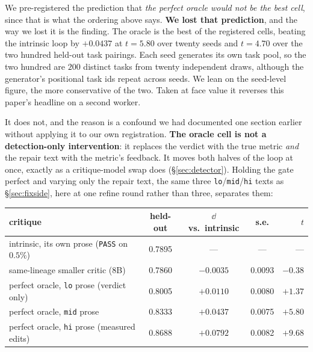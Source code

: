 \documentclass[11pt]{article}
\begin{document}
We pre-registered the prediction that \emph{the perfect oracle would not be the best cell}, since
that is what the ordering above says. \textbf{We lost that prediction}, and the way we lost it is
the finding. The oracle is the best of the registered cells, beating the intrinsic loop by
$+0.0437$ at $t = 5.80$ over twenty seeds and
$t = 4.70$ over the two hundred held-out task pairings. Each seed generates its own task pool, so
the two hundred are $200$ distinct tasks from twenty independent draws, although the generator's
positional task ids repeat across seeds. We lean on the seed-level figure, the more conservative
of the two. Taken at face value it reverses
this paper's headline on a second worker.

It does not, and the reason is a confound we had documented one section earlier without applying it
to our own registration. \textbf{The oracle cell is not a detection-only intervention}: it replaces
the verdict with the true metric \emph{and} the repair text with the metric's feedback. It moves
both halves of the loop at once, exactly as a critique-model swap does
(\S\ref{sec:detector}). Holding the gate perfect and varying only the repair text, the same
three \texttt{lo}/\texttt{mid}/\texttt{hi} texts as \S\ref{sec:fixside}, here at one refine round
rather than three, separates them:

\begin{center}\small
\begin{tabular}{lcccr}
\toprule
critique & held-out & $\dd$ vs.\ intrinsic & s.e. & $t$ \\
\midrule
intrinsic, its own prose (\texttt{PASS} on $0.5\%$) & 0.7895 & --- & --- & --- \\
same-lineage smaller critic (8B) & 0.7860 & $-0.0035$ & 0.0093 & $-0.38$ \\
\midrule
perfect oracle, \texttt{lo} prose (verdict only) & 0.8005 & $+0.0110$ & 0.0080 & $+1.37$ \\
perfect oracle, \texttt{mid} prose & 0.8333 & $+0.0437$ & 0.0075 & $\mathbf{+5.80}$ \\
perfect oracle, \texttt{hi} prose (measured edits) & 0.8688 & $+0.0792$ & 0.0082 & $\mathbf{+9.68}$ \\
\bottomrule
\end{tabular}
\end{center}
\end{document}
